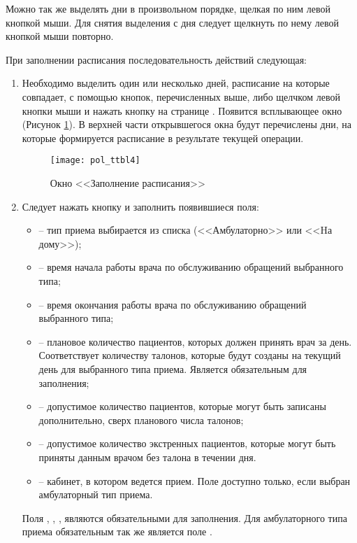 Можно так же выделять дни в произвольном порядке, щелкая по ним левой кнопкой мыши. Для снятия выделения с дня следует щелкнуть по нему левой кнопкой мыши повторно.


При заполнении расписания последовательность действий следующая: 
\begin{enumerate}
 \item \label{n2} Необходимо выделить один или несколько дней, расписание на которые совпадает, с помощью кнопок, перечисленных выше, либо щелчком левой кнопки мыши и нажать кнопку  на странице . Появится всплывающее окно  (Рисунок \ref{img_pol_ttbl4}). В верхней части открывшегося окна будут перечислены дни, на которые формируется расписание в результате текущей операции. 

 \begin{figure}[ht]\centering
  \texttt{[image: pol\_ttbl4]}
  \caption{Окно <<Заполнение расписания>>}
  \label{img_pol_ttbl4}
 \end{figure}

 \item \label{n1} Следует нажать кнопку  и заполнить появившиеся поля:
 \begin{itemize}
  \item {} -- тип приема выбирается из списка (<<Амбулаторно>> или <<Hа дому>>);
  \item {} -- время начала работы врача по обслуживанию обращений выбранного типа;
  \item {} -- время окончания работы врача по обслуживанию обращений выбранного типа;
  \item {} -- плановое количество пациентов, которых должен принять врач за день. Соответствует количеству талонов, которые будут созданы на текущий день для выбранного типа приема. Является обязательным для заполнения;
  \item {} -- допустимое количество пациентов, которые могут быть записаны дополнительно, сверх планового числа талонов;
  \item {} -- допустимое количество экстренных пациентов, которые могут быть приняты данным врачом без талона в течении дня.
  \item {} -- кабинет, в котором ведется прием. Поле доступно только, если выбран амбулаторный тип приема.
 \end{itemize}
 Поля , , ,  являются обязательными для заполнения.  Для амбулаторного типа приема обязательным так же является поле .


\end{enumerate}
